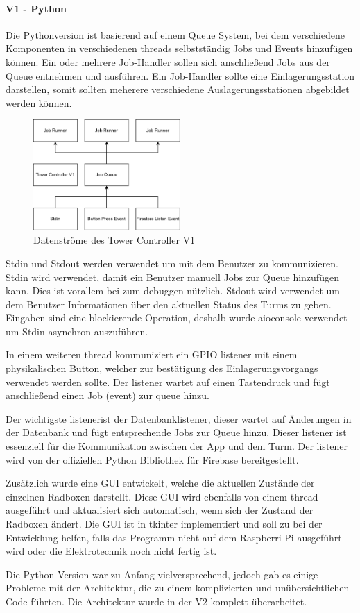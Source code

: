 \paragraph{V1 - Python}
Die Pythonversion ist basierend auf einem Queue System, bei dem verschiedene Komponenten in verschiedenen \Glspl{thread} selbstständig Jobs und Events hinzufügen können. Ein oder mehrere Job-Handler sollen sich anschließend Jobs aus der Queue entnehmen und ausführen. Ein Job-Handler sollte eine Einlagerungsstation darstellen, somit sollten meherere verschiedene Auslagerungsstationen abgebildet werden können.

\begin{figure}[H]
  \centering
  \includegraphics[width=0.5\textwidth]{images/tower_controller_v1.png}
  \caption{Datenströme des Tower Controller V1}
  \label{fig:tower_controller_v1}
\end{figure}

\ac{Stdin} und \ac{Stdout} werden verwendet um mit dem Benutzer zu kommunizieren. \ac{Stdin} wird verwendet, damit ein Benutzer manuell Jobs zur Queue hinzufügen kann. Dies ist vorallem bei zum \Gls{debuggen} nützlich. \ac{Stdout} wird verwendet um dem Benutzer Informationen über den aktuellen Status des Turms zu geben. Eingaben sind eine blockierende Operation, deshalb wurde aioconsole verwendet um \ac{Stdin} asynchron auszuführen.

In einem weiteren \Gls{thread} kommuniziert ein \ac{GPIO} \Gls{listener} mit einem physikalischen Button, welcher zur bestätigung des Einlagerungsvorgangs verwendet werden sollte. Der \Gls{listener} wartet auf einen Tastendruck und fügt anschließend einen Job (\Gls{event}) zur \Gls{queue} hinzu.

Der wichtigste \Gls{listener}ist der Datenbanklistener, dieser wartet auf Änderungen in der Datenbank und fügt entsprechende Jobs zur Queue hinzu. Dieser \Gls{listener} ist essenziell für die Kommunikation zwischen der App und dem Turm. Der \Gls{listener} wird von der offiziellen Python Bibliothek für Firebase bereitgestellt.

Zusätzlich wurde eine \ac{GUI} entwickelt, welche die aktuellen Zustände der einzelnen Radboxen darstellt. Diese \ac{GUI} wird ebenfalls von einem \Gls{thread} ausgeführt und aktualisiert sich automatisch, wenn sich der Zustand der Radboxen ändert. Die \ac{GUI} ist in tkinter implementiert und soll zu bei der Entwicklung helfen, falls das Programm nicht auf dem Raspberri Pi ausgeführt wird oder die Elektrotechnik noch nicht fertig ist.

Die Python Version war zu Anfang vielversprechend, jedoch gab es einige Probleme mit der Architektur, die zu einem komplizierten und unübersichtlichen Code führten. Die Architektur wurde in der V2 komplett überarbeitet.
